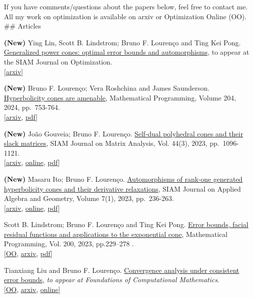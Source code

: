 If you have comments/questions about the papers below, feel free to
contact me. All my work on optimization is available on arxiv or
Optimization Online (OO). \#\# Articles

\textbf{(New)} Ying Lin, Scott B. Lindstrom; Bruno F. Lourenço and Ting
Kei Pong. \href{https://arxiv.org/abs/2211.16142}{Generalized power
cones: optimal error bounds and automorphisms}, to appear at the SIAM
Journal on Optimization.\\
{[}\href{https://arxiv.org/abs/2211.16142}{arxiv}{]}

\textbf{(New)} Bruno F. Lourenço; Vera Roshchina and James Saunderson.
\href{https://link.springer.com/article/10.1007/s10107-023-01958-0}{Hyperbolicity
cones are amenable}, Mathematical Programming, Volume 204, 2024,
pp.~753-764.\\
{[}\href{https://arxiv.org/abs/2102.06359}{arxiv},
\href{/papers/hyper_amenable.pdf}{pdf}{]}

\textbf{(New)} João Gouveia; Bruno F. Lourenço.
\href{https://epubs.siam.org/doi/full/10.1137/22M1519869}{Self-dual
polyhedral cones and their slack matrices}, SIAM Journal on Matrix
Analysis, Vol. 44(3), 2023, pp.~1096-1121.\\
{[}\href{https://arxiv.org/abs/2207.11747}{arxiv},
\href{https://epubs.siam.org/eprint/T5FGNVMCVZZUGSG4UAAH/full}{online},
\href{/papers/self_dual_poly.pdf}{pdf}{]}

\textbf{(New)} Masaru Ito; Bruno F. Lourenço.
\href{https://epubs.siam.org/doi/10.1137/22M1513964}{Automorphisms of
rank-one generated hyperbolicity cones and their derivative
relaxations}, SIAM Journal on Applied Algebra and Geometry, Volume 7(1),
2023, pp.~236-263.\\
{[}\href{https://arxiv.org/abs/2207.11986}{arxiv},
\href{https://epubs.siam.org/eprint/NEJB5FDCBJQZUNQU6USE/full}{online},
\href{/papers/hyper_rog.pdf}{pdf}{]}

Scott B. Lindstrom; Bruno F. Lourenço and Ting Kei Pong.
\href{https://link.springer.com/article/10.1007/s10107-022-01883-8}{Error
bounds, facial residual functions and applications to the exponential
cone}, Mathematical Programming, Vol. 200, 2023, pp.229--278 .\\
{[}\href{http://www.optimization-online.org/DB_HTML/2020/12/8177.html}{OO},
\href{https://arxiv.org/abs/2010.16391}{arxiv},
\href{/papers/frf_exp.pdf}{pdf}{]}

Tianxiang Liu and Bruno F. Lourenço.
\href{https://link.springer.com/article/10.1007/s10208-022-09586-4}{Convergence
analysis under consistent error bounds}, \emph{to appear at Foundations
of Computational Mathematics}.\\
{[}\href{http://www.optimization-online.org/DB_HTML/2020/07/7920.html}{OO},
\href{https://arxiv.org/abs/2008.12968}{arxiv},
\href{https://rdcu.be/cXQkr}{online}{]}

